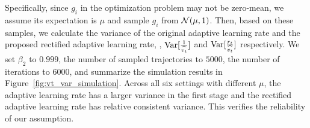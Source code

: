 Specifically, since $g_i$ in the optimization problem may not be zero-mean, we assume its expectation is $\mu$ and sample $g_i$ from $\mathcal{N}(\mu, 1)$.
Then, based on these samples, we calculate the variance of the original adaptive learning rate and the proposed rectified adaptive learning rate, \ie,  $\operatorname{{\rm Var}}[\frac{1}{\widehat{v_t}}]$ and $\operatorname{{\rm Var}}[\frac{r_t}{\widehat{v_t}}]$ respectively.
We set $\beta_2$ to $0.999$, the number of sampled trajectories to $5000$, the number of iterations to $6000$, and summarize the simulation results in Figure~\ref{fig:vt_var_simulation}. 
Across all six settings with different $\mu$, the adaptive learning rate has a larger variance in the first stage and the rectified adaptive learning rate has relative consistent variance. 
This verifies the reliability of our assumption. 










